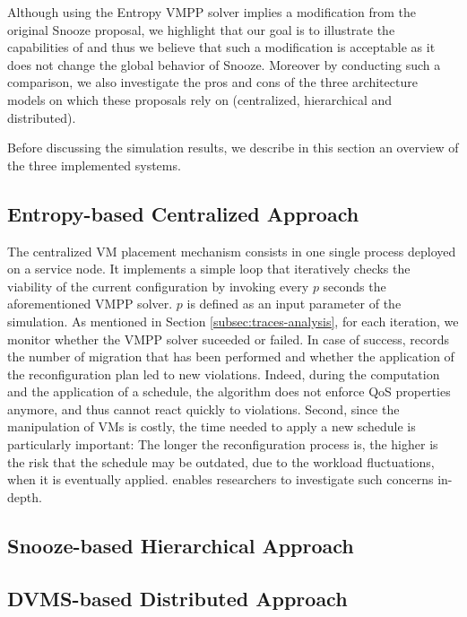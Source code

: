 %
Although using the Entropy VMPP solver
implies a modification from the original Snooze proposal,  we
highlight that our goal is to illustrate the capabilities of \vmps and
thus we believe that such a modification is acceptable as it does not
change the global behavior of Snooze. Moreover by
conducting such a comparison, we also investigate the pros and cons of
the three  architecture models on which these proposals rely on (\ie centralized, hierarchical and
distributed).

%
Before discussing the simulation results, we
describe in this section an overview of the three implemented systems.

\subsection{Entropy-based Centralized Approach}
\label{subsec:entropy}
The centralized VM placement mechanism consists in one single \sg
process deployed on a service node. It implements a simple loop that
iteratively checks the viability of the current configuration by
invoking every $p$ seconds the aforementioned VMPP solver. $p$ is
defined as an input parameter of the simulation. As mentioned in
Section \ref{subsec:traces-analysis}, for each iteration, we monitor
whether the VMPP solver suceeded or failed. In case of success, \vmps
records the number of migration that has been performed and whether
the application of the reconfiguration plan led to new violations.
Indeed, during
the computation and the application of a schedule, the algorithm does
not enforce QoS properties anymore, and thus cannot react quickly to
violations. Second, since the manipulation of VMs is costly, the time
needed to apply a new schedule is particularly important: The longer
the reconfiguration process is, the higher is the risk that the schedule may
be outdated, due to the workload fluctuations, when it is eventually
applied.
\vmps enables researchers to investigate such concerns in-depth.


\subsection{Snooze-based Hierarchical Approach}
\label{subsec:snooze}


\subsection{DVMS-based Distributed Approach}
\label{subsec:dvms}

